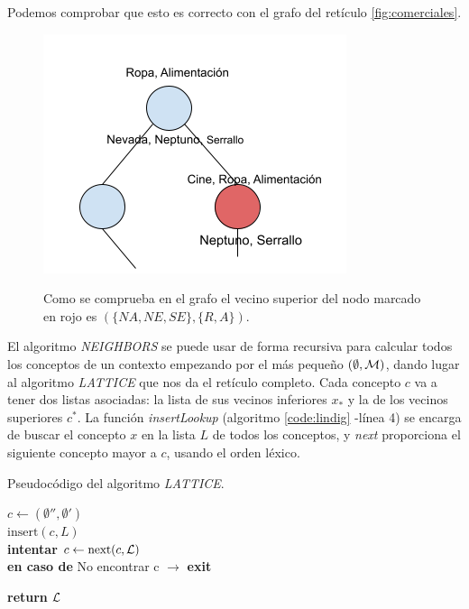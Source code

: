 \documentclass[oneside,openright,titlepage,numbers=noenddot,openany,headinclude,footinclude=true,
cleardoublepage=empty,abstractoff,BCOR=5mm,paper=a4,fontsize=12pt,main=spanish]{scrreprt}
\begin{document}
Podemos comprobar que esto es correcto con el grafo del retículo \ref{fig:comerciales}.

\begin{figure}[H]
  \centering
  \includegraphics[scale=0.7]{images/grafolindig.png}
  \label{fig:test2}
\caption{Como se comprueba en el grafo el vecino superior del nodo marcado en rojo es $(\{NA,NE,SE\},\{R,A\})$.}
\end{figure}

El algoritmo \textit{NEIGHBORS} se puede usar de forma recursiva para calcular todos los conceptos de un contexto empezando por el más pequeño $(\emptyset, \mathcal{M})$, dando lugar al algoritmo \textit{LATTICE} \cite{lindig_concept-based_nodate} que nos da el retículo completo. Cada concepto $c$ va a tener dos listas asociadas: la lista de sus vecinos inferiores $x_*$ y la de los vecinos superiores $c^*$. La función \textit{insertLookup} (algoritmo \ref{code:lindig} -línea 4)  se encarga de buscar el concepto $x$ en la lista $L$ de todos los conceptos, y \textit{next} proporciona el siguiente concepto mayor a $c$, usando el orden léxico.

\begin{algorithm}[H]
\caption{Pseudocódigo del algoritmo \textit{LATTICE}.}
\label{code:lindig}
     \KwIn{$(\G,\M,\I)$}
     $c \leftarrow (\emptyset '', \emptyset ')$\\
     $\text{insert}(c,L)$\\
    \textbf{intentar} $c \leftarrow \text{next}(c,\mathcal{L})$\\
    \textbf{en caso de} No encontrar c $\rightarrow$ \textbf{exit}
    
    \textbf{return }$\mathcal{L}$

\end{algorithm}
\end{document}
